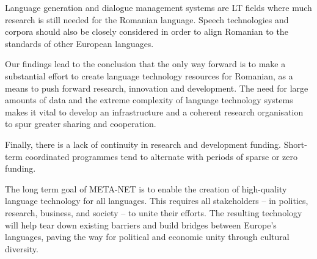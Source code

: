 \begin{multicols}{2}
Language generation and dialogue management systems are LT fields where much research is still needed for the Romanian language. Speech technologies and corpora should also be closely considered in order to align Romanian to the standards of other European languages.

Our findings lead to the conclusion that the only way forward is to make a substantial effort to create language technology resources for Romanian, as a means to push forward research, innovation and development. The need for large amounts of data and the extreme complexity of language technology systems makes it vital to develop an infrastructure and a coherent research organisation to spur greater sharing and cooperation.

Finally, there is a lack of continuity in research and development funding. Short-term coordinated programmes tend to alternate with periods of sparse or zero funding. %

The long term goal of META-NET is to enable the creation of high-quality language technology for all languages. This requires all stakeholders -- in politics, research, business, and society -- to unite their efforts. The resulting technology will help tear down existing barriers and build bridges between Europe’s languages, paving the way for political and economic unity through cultural diversity. 

\end{multicols}

